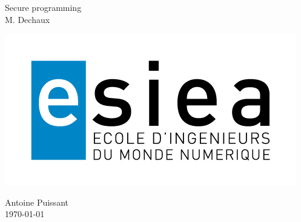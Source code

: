 \begin{titlepage}
 
 \begin{center}
  
  \vspace*{2cm}
  {\Huge Secure programming}\\
  \vspace{.7cm}
  {\huge M. Dechaux}
  \vspace{2cm}

   \begin{center}
     \includegraphics[width=.9\textwidth]{./img/esiea.jpeg}
   \end{center}
  \vspace{1cm}
  {\Large Antoine Puissant}\\
  \vspace{1cm}
  {\Large \today}
  
 \end{center}

 
\end{titlepage}
